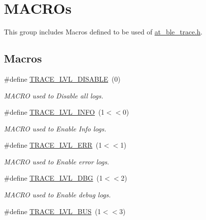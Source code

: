 \hypertarget{group__dbg__logs__group__macros}{}\section{M\+A\+C\+R\+Os}
\label{group__dbg__logs__group__macros}


This group includes Macros defined to be used of \mbox{\hyperlink{at__ble__trace_8h}{at\+\_\+ble\+\_\+trace.\+h}}.  


\subsection*{Macros}
\begin{DoxyCompactItemize}
\item 
\#define \mbox{\hyperlink{group__dbg__logs__group__macros_gace8cb4d27850d1dd4f033141b8453e7e}{T\+R\+A\+C\+E\+\_\+\+L\+V\+L\+\_\+\+D\+I\+S\+A\+B\+LE}}~(0)
\begin{DoxyCompactList}\small\item\em M\+A\+C\+RO used to Disable all logs. \end{DoxyCompactList}\item 
\#define \mbox{\hyperlink{group__dbg__logs__group__macros_ga0d0272a070477f118748192f15de8bbd}{T\+R\+A\+C\+E\+\_\+\+L\+V\+L\+\_\+\+I\+N\+FO}}~(1$<$$<$0)
\begin{DoxyCompactList}\small\item\em M\+A\+C\+RO used to Enable Info logs. \end{DoxyCompactList}\item 
\#define \mbox{\hyperlink{group__dbg__logs__group__macros_gaf16c69802e204beafd674a0dbe695d2a}{T\+R\+A\+C\+E\+\_\+\+L\+V\+L\+\_\+\+E\+RR}}~(1$<$$<$1)
\begin{DoxyCompactList}\small\item\em M\+A\+C\+RO used to Enable error logs. \end{DoxyCompactList}\item 
\#define \mbox{\hyperlink{group__dbg__logs__group__macros_gae93afb7fdeb07a8650682ee5444f7f40}{T\+R\+A\+C\+E\+\_\+\+L\+V\+L\+\_\+\+D\+BG}}~(1$<$$<$2)
\begin{DoxyCompactList}\small\item\em M\+A\+C\+RO used to Enable debug logs. \end{DoxyCompactList}\item 
\#define \mbox{\hyperlink{group__dbg__logs__group__macros_gae42709942da29e543787ad580f49b841}{T\+R\+A\+C\+E\+\_\+\+L\+V\+L\+\_\+\+B\+US}}~(1$<$$<$3)

\end{DoxyCompactItemize}
